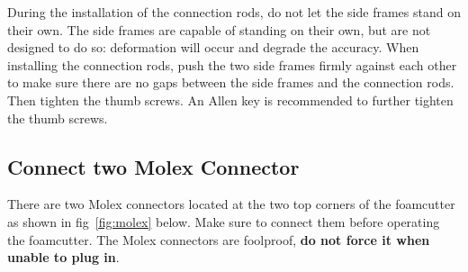 \documentclass[titlepage,12pt,letter]{report}
\numberwithin{equation}{chapter}
\begin{document}
During the installation of the connection rods, do not let the side frames stand on their own. The side frames are capable of standing on their own, but are not designed to do so: deformation will occur and degrade the accuracy. When installing the connection rods, push the two side frames firmly against each other to make sure there are no gaps between the side frames and the connection rods. Then tighten the thumb screws. An Allen key is recommended to further tighten the thumb screws.

\subsection{Connect two Molex Connector}

There are two Molex connectors located at the two top corners of the foamcutter as shown in fig~\ref{fig:molex} below. Make sure to connect them before operating the foamcutter. The Molex connectors are foolproof, \textbf{do not force it when unable to plug in}.
\end{document}
